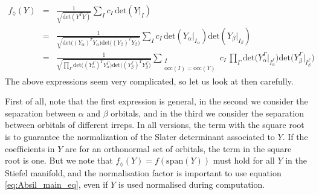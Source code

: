 \documentclass[a4paper,11pt]{article}
\newcommand{\irp}{\ensuremath{\Gamma}}
\begin{document}
\begin{eqnarray}
  \label{eq:gen_f}
  f_\lozenge(Y)
  &=& \frac{1}{\sqrt{\text{det} \left( Y^T Y \right)}}
      \sum_{I} c_I \, \text{det} \left( Y\big|_I \right)\\
  &=& \frac{1}{\sqrt{
      \text{det} \Big( (Y_\alpha)^T Y_\alpha \Big)
      \text{det} \Big( (Y_\beta)^T Y_\beta \Big)
      }}
      \sum_{I} c_I \,
      \text{det} \left( Y_\alpha\big|_{I_\alpha} \right)
      \text{det} \left( Y_\beta\big|_{I_\beta} \right)\\\label{eq:f_diam_spin_irrep}
  &=& \frac{1}{\sqrt{
      \prod_\irp
      \text{det} \Big( (Y_\alpha^\irp)^T Y_\alpha^\irp \Big)
      \text{det} \Big( (Y_\beta^\irp)^T Y_\beta^\irp \Big)
      }}
      \sum_{\substack{I\\\text{occ}(I) = \text{occ}(Y)}} c_I \,
  \prod_\irp
  \text{det} \Big( Y_\alpha^\irp\big|_{I_\alpha^\irp} \Big)
  \text{det} \Big( Y_\beta^\irp\big|_{I_\beta^\irp} \Big)
\end{eqnarray}
The above expressions seem very complicated, so let us look at then carefully.

First of all, note that the first expression is general, in the second we consider the separation between $\alpha$ and $\beta$ orbitals, and in the third we consider the separation between orbitals of different irreps.
In all versions, the term with the square root is to guarantee the normalization of the Slater determinant associated to $Y$.
If the coefficients in $Y$ are for an orthonormal set of orbitals, the term in the square root is one.
But we note that $f_\lozenge(Y) = f(\text{span}(Y))$ must hold for all $Y$ in the Stiefel manifold, and the normalisation factor is important to use equation \eqref{eq:Absil_main_eq}, even if $Y$ is used normalised during computation.
\end{document}
